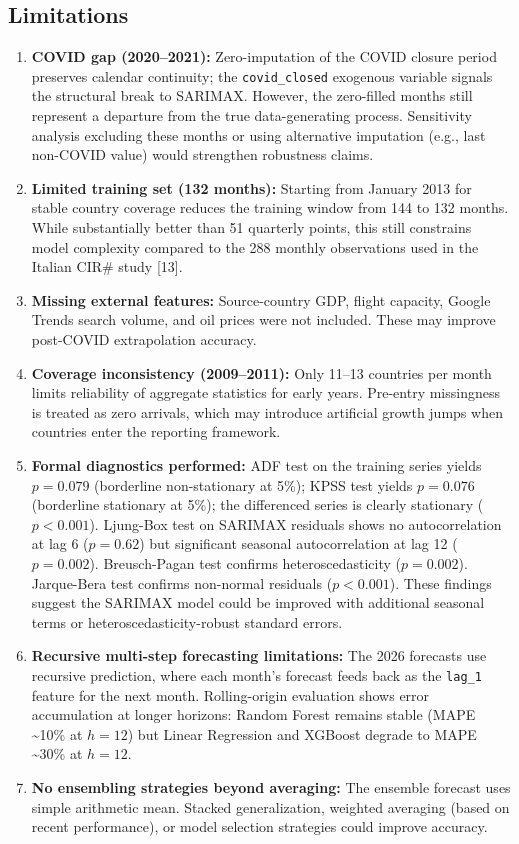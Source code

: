 \documentclass[
]{article}
\providecommand{\tightlist}{%
  \setlength{\itemsep}{0pt}\setlength{\parskip}{0pt}}
\begin{document}
\subsection{Limitations}\label{limitations}

\begin{enumerate}
\def\labelenumi{\arabic{enumi}.}
\tightlist
\item
  \textbf{COVID gap (2020--2021):} Zero-imputation of the COVID closure
  period preserves calendar continuity; the \texttt{covid\_closed}
  exogenous variable signals the structural break to SARIMAX. However,
  the zero-filled months still represent a departure from the true
  data-generating process. Sensitivity analysis excluding these months
  or using alternative imputation (e.g., last non-COVID value) would
  strengthen robustness claims.
\item
  \textbf{Limited training set (132 months):} Starting from January 2013
  for stable country coverage reduces the training window from 144 to
  132 months. While substantially better than 51 quarterly points, this
  still constrains model complexity compared to the 288 monthly
  observations used in the Italian CIR\# study {[}13{]}.
\item
  \textbf{Missing external features:} Source-country GDP, flight
  capacity, Google Trends search volume, and oil prices were not
  included. These may improve post-COVID extrapolation accuracy.
\item
  \textbf{Coverage inconsistency (2009--2011):} Only 11--13 countries
  per month limits reliability of aggregate statistics for early years.
  Pre-entry missingness is treated as zero arrivals, which may introduce
  artificial growth jumps when countries enter the reporting framework.
\item
  \textbf{Formal diagnostics performed:} ADF test on the training series
  yields \(p = 0.079\) (borderline non-stationary at 5\%); KPSS test
  yields \(p = 0.076\) (borderline stationary at 5\%); the differenced
  series is clearly stationary (\(p < 0.001\)). Ljung-Box test on
  SARIMAX residuals shows no autocorrelation at lag 6 (\(p = 0.62\)) but
  significant seasonal autocorrelation at lag 12 (\(p = 0.002\)).
  Breusch-Pagan test confirms heteroscedasticity (\(p = 0.002\)).
  Jarque-Bera test confirms non-normal residuals (\(p < 0.001\)). These
  findings suggest the SARIMAX model could be improved with additional
  seasonal terms or heteroscedasticity-robust standard errors.
\item
  \textbf{Recursive multi-step forecasting limitations:} The 2026
  forecasts use recursive prediction, where each month's forecast feeds
  back as the \texttt{lag\_1} feature for the next month. Rolling-origin
  evaluation shows error accumulation at longer horizons: Random Forest
  remains stable (MAPE \textasciitilde10\% at \(h = 12\)) but Linear
  Regression and XGBoost degrade to MAPE \textasciitilde30\% at
  \(h = 12\).
\item
  \textbf{No ensembling strategies beyond averaging:} The ensemble
  forecast uses simple arithmetic mean. Stacked generalization, weighted
  averaging (based on recent performance), or model selection strategies
  could improve accuracy.
\end{enumerate}
\end{document}

